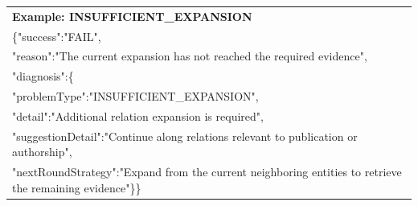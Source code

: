 {\begin{longtable}{@{}p{}@{}}

\textbf{Example: INSUFFICIENT\_EXPANSION}
\\

{\ttfamily
\{"success":"FAIL",
}
\\

{\ttfamily
"reason":"The current expansion has not reached the required evidence",
}
\\

{\ttfamily
"diagnosis":\{
}
\\

{\ttfamily
"problemType":"INSUFFICIENT\_EXPANSION",
}
\\

{\ttfamily
"detail":"Additional relation expansion is required",
}
\\

{\ttfamily
"suggestionDetail":"Continue along relations relevant to publication or authorship",
}
\\

{\ttfamily
"nextRoundStrategy":"Expand from the current neighboring entities to retrieve the remaining evidence"\}\}
}\\



\end{longtable}
}